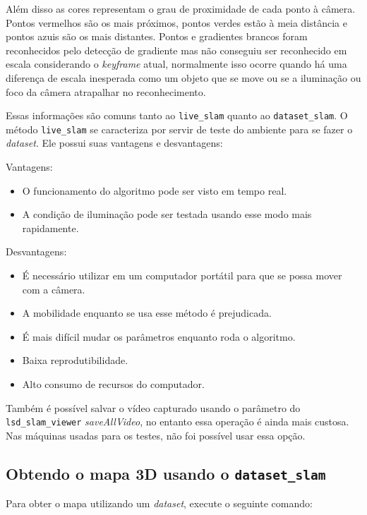 Além disso as cores representam o grau de proximidade de cada ponto à câmera. Pontos vermelhos são os mais próximos, pontos verdes estão à meia distância e pontos azuis são os mais distantes. Pontos e gradientes brancos foram reconhecidos pelo detecção de gradiente mas não conseguiu ser reconhecido em escala considerando o \textit{keyframe} atual, normalmente isso ocorre quando há uma diferença de escala inesperada como um objeto que se move ou se a iluminação ou foco da câmera atrapalhar no reconhecimento.

Essas informações são comuns tanto ao \texttt{live\_slam} quanto ao \texttt{dataset\_slam}. O método \texttt{live\_slam} se caracteriza por servir de teste do ambiente para se fazer o \textit{dataset}. Ele possui suas vantagens e desvantagens:

Vantagens:

\begin{itemize}
	\item{O funcionamento do algoritmo pode ser visto em tempo real.}
	\item{A condição de iluminação pode ser testada usando esse modo mais rapidamente.}
\end{itemize}

Desvantagens:

\begin{itemize}
	\item{É necessário utilizar em um computador portátil para que se possa mover com a câmera.}
	\item{A mobilidade enquanto se usa esse método é prejudicada.}
	\item{É mais difícil mudar os parâmetros enquanto roda o algoritmo.}
	\item{Baixa reprodutibilidade.}
	\item{Alto consumo de recursos do computador.}
\end{itemize}	

Também é possível salvar o vídeo capturado usando o parâmetro do \texttt{lsd\_slam\_viewer} \textit{saveAllVideo}, no entanto essa operação é ainda mais custosa. Nas máquinas usadas para os testes, não foi possível usar essa opção.

\subsection{Obtendo o mapa 3D usando o \texttt{dataset\_slam}}

Para obter o mapa utilizando um \textit{dataset}, execute o seguinte comando:

